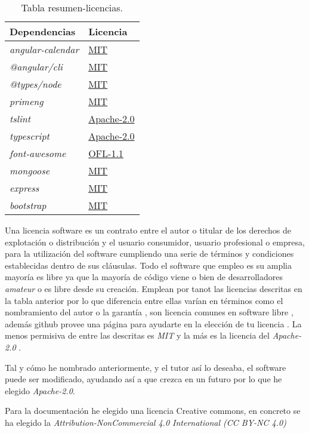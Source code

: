\begin{table}[H]
\begin{center}
\begin{tabular}{|l|l|}
\hline
Dependencias & Licencia \\
\hline \hline
\emph{angular-calendar} & \href{https://opensource.org/licenses/MIT}{MIT}\\ \hline
\emph{@angular/cli} & \href{https://opensource.org/licenses/MIT}{MIT}\\ \hline
\emph{@types/node} & \href{https://opensource.org/licenses/MIT}{MIT}\\ \hline
\emph{primeng} & \href{https://opensource.org/licenses/MIT}{MIT}\\ \hline
\emph{tslint} & \href{https://opensource.org/licenses/Apache-2.0}{Apache-2.0}\\ \hline
\emph{typescript} & \href{https://opensource.org/licenses/Apache-2.0}{Apache-2.0}\\ \hline
\emph{font-awesome} & \href{https://opensource.org/licenses/OFL-1.1}{OFL-1.1}\\ \hline
\emph{mongoose} & \href{https://opensource.org/licenses/MIT}{MIT}\\ \hline
\emph{express} & \href{https://opensource.org/licenses/MIT}{MIT}\\ \hline
\emph{bootstrap} & \href{https://opensource.org/licenses/MIT}{MIT}\\ \hline

\end{tabular}
\caption{Tabla resumen-licencias.}
\label{tabla:licencias}
\end{center}
\end{table}


Una licencia software es un contrato entre el autor o titular de los derechos de explotación o distribución y el usuario consumidor, usuario profesional o empresa, para la utilización del software cumpliendo una serie de términos y condiciones establecidas dentro de sus cláusulas. Todo el software que empleo es su amplia mayoría es libre ya que la mayoría de código viene o bien de desarrolladores \emph{amateur} o es libre desde su creación. Emplean por tanot las licencias descritas en la tabla anterior por lo que diferencia entre ellas varían en términos como el nombramiento del autor o la garantía , son licencia comunes en software libre \cite{githublicense} , además github provee una página para ayudarte en la elección de tu licencia \citep{githubchoose}. La menos permisiva de entre las descritas es \emph{MIT} \citep{mit}  y la más es la licencia del  \emph{Apache-2.0} \cite{apache}.

Tal y cómo he nombrado anteriormente, y el tutor así lo deseaba, el software puede ser modificado, ayudando así a que crezca en un futuro
por lo que he elegido \emph{Apache-2.0}. 


Para la documentación he elegido una licencia Creative commons, en concreto se ha elegido la \emph{Attribution-NonCommercial 4.0 International (CC BY-NC 4.0)}





